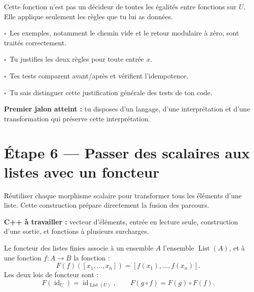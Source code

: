 \documentclass[11pt,a4paper]{article}
\newcommand{\code}[1]{\texttt{\detokenize{#1}}}
\newcommand{\Id}{\operatorname{id}}
\newcommand{\List}{\operatorname{List}}
\newcommand{\checkpoint}{\(\square\)\ }
\newcommand{\etape}[2]{\clearpage\section{Étape #1 — #2}}
\begin{document}
Cette fonction n'est pas un décideur de toutes les égalités entre fonctions
sur \(U\). Elle applique seulement les règles que tu lui as données.

\begin{validation}
\checkpoint Les exemples, notamment le chemin vide et le retour modulaire à
zéro, sont traités correctement.\par
\checkpoint Tu justifies les deux règles pour toute entrée \(x\).\par
\checkpoint Tes tests comparent avant/après et vérifient l'idempotence.\par
\checkpoint Tu sais distinguer cette justification générale des tests de ton code.
\end{validation}

\textbf{Premier jalon atteint :} tu disposes d'un langage, d'une interprétation
et d'une transformation qui préserve cette interprétation.

\etape{6}{Passer des scalaires aux listes avec un foncteur}
\label{sec:map}
\begin{objectif}
Réutiliser chaque morphisme scalaire pour transformer tous les éléments
d'une liste. Cette construction prépare directement la fusion des parcours.
\end{objectif}

\textbf{C++ à travailler :} vecteur d'éléments, entrée en lecture seule,
construction d'une sortie, \code{reserve} et fonctions à plusieurs surcharges.

\begin{theorie}
Le foncteur des listes finies associe à un ensemble \(A\) l'ensemble
\(\List(A)\), et à une fonction \(f:A\to B\) la fonction :
\[
F(f)([x_1,\ldots,x_n])=[f(x_1),\ldots,f(x_n)].
\]
Les deux lois de foncteur sont :
\[
F(\Id_U)=\Id_{\List(U)},\qquad
F(g\circ f)=F(g)\circ F(f).
\]
\end{theorie}
\end{document}
